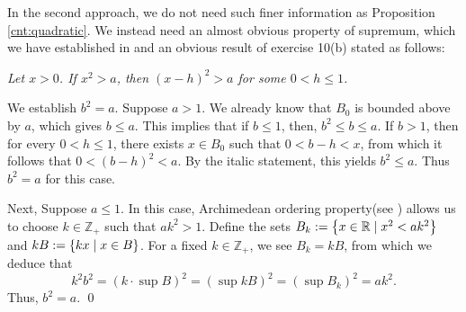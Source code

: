 \documentclass[a4paper,12pt]{article}
\begin{document}
\begin{rem}\label{note:root2}
	In the second approach,
	we do not need such finer information as Proposition \ref{cnt:quadratic}.
	We instead need an almost obvious property of supremum, which we have established in  and an obvious result of exercise 10(b) stated as follows:\leavevmode \par
	\noindent
	\textit{Let \( x>0 \).
		If \( x^2 > a\),
		then
		\( (x-h)^2 > a\)
		for some \( 0<h\le 1\).
	}
	
	We establish
	\( b^2 = a \).
	Suppose
	\( a>1 \).
	We already know that
	\( B_0 \) is bounded above by \( a \),
	which gives
	\( b\le a \).
	This implies that if
	\( b \le 1 \),
	then,
	\( b^2 \le b \le a \).
	If \( b>1 \),
	then for every
	\( 0<h\le1 \),
	there exists
	\(  x \in B_0 \)
	such that
	\( 0< b-h <x \),
	from which it follows that
	\( 0< (b-h)^2<a \).
	By the italic statement, this yields
	\( b^2 \le a \).
	Thus \( b^2 =a \) for this case.
	
	Next, Suppose
	\( a \le 1 \).
	In this case,
	Archimedean ordering property(see ) allows us to choose
	\( k \in \mathbb{Z}_{+} \)
	such that 
	\( ak^2 >1 \).
	Define the sets
	\( B_k:=\left\{  x \in \mathbb{R} \;|\; x^2 < ak^2 \right\} \)
	and
	\( kB:=\left\{ kx \;|\; x \in B \right\} \).
	For a fixed \( k \in \mathbb{Z}_{+} \), we see 
	\( B_k = kB \),
	from which we deduce that
	\begin{equation*}
		k^2b^2
		=
		\left( k \cdot \sup{B} \right)^2
		=
		\left( \sup{kB} \right)^2
		=
		\left( \sup{B_k} \right)^2
		=
		ak^2.
	\end{equation*}
	Thus, \( b^2 =a \).
	\qed\end{rem}
\end{document}
